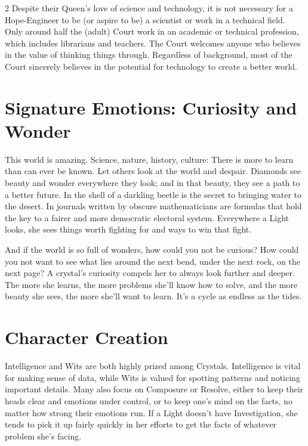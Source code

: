 \begin{multicols}{2}
Despite their Queen's love of science and technology, it is not necessary for a Hope-Engineer to be (or aspire to be) a scientist or work in a technical field.  Only around half the (adult) Court work in an academic or technical profession, which includes librarians and teachers. The Court welcomes anyone who believes in the value of thinking things through. Regardless of background, most of the Court sincerely believes in the potential for technology to create a better world. 


\section*{Signature Emotions: Curiosity and Wonder}

This world is amazing. Science, nature, history, culture: There is more to learn than can ever be known. Let others look at the world and despair. Diamonds see beauty and wonder everywhere they look; and in that beauty, they see a path to a better future. In the shell of a darkling beetle is the secret to bringing water to the desert. In journals written by obscure mathematicians are formulas that hold the key to a fairer and more democratic electoral system. Everywhere a Light looks, she sees things worth fighting for and ways to win that fight. 

And if the world is so full of wonders, how could you not be curious? How could you not want to see what lies around the next bend, under the next rock, on the next page? A crystal's curiosity compels her to always look further and deeper. The more she learns, the more problems she'll know how to solve, and the more beauty she sees, the more she'll want to learn. It's a cycle as endless as the tides. 

\section*{Character Creation}
Intelligence and Wits are both highly prized among Crystals. Intelligence is vital for making sense of data, while Wits is valued for spotting patterns and noticing important details. Many also focus on Composure or Resolve, either to keep their heads clear and emotions under control, or to keep one's mind on the facts, no matter how strong their emotions run. If a Light doesn't have Investigation, she tends to pick it up fairly quickly in her efforts to get the facts of whatever problem she's facing. 


\end{multicols}
